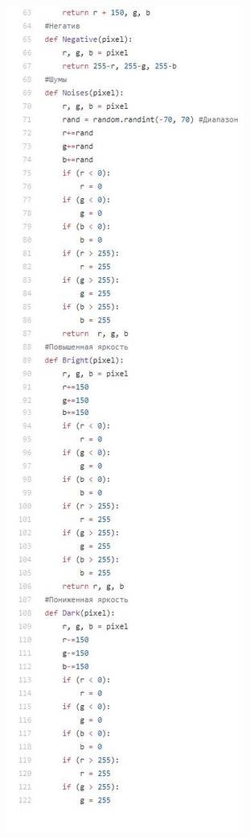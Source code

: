 \documentclass[a4paper,12pt]{article}
\begin{document}
\newpage
\begin{figure}

\begin{minipage}[h]{0.4\linewidth}
\includegraphics[width=1.1\linewidth]{code_2}
\end{minipage}


\end{figure}
\end{document}
